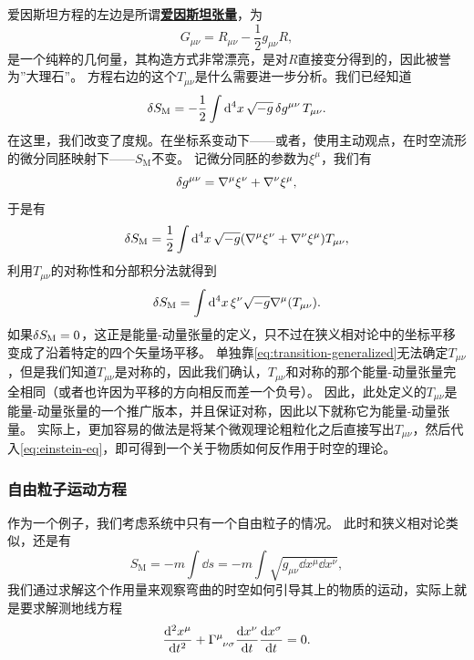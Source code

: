 \documentclass[hyperref, UTF8, a4paper]{ctexart}
\newcommand*{\concept}[1]{\underline{\textbf{#1}}}
\begin{document}
爱因斯坦方程的左边是所谓\concept{爱因斯坦张量}，为
\begin{equation}
    G_{\mu \nu} = R_{\mu \nu} - \frac{1}{2} g_{\mu \nu} R,
\end{equation}
是一个纯粹的几何量，其构造方式非常漂亮，是对$R$直接变分得到的，因此被誉为”大理石”。
方程右边的这个$T_{\mu \nu}$是什么需要进一步分析。我们已经知道
\[
    \var{S_\text{M}} = - \frac{1}{2} \int \dd[4]{x} \sqrt{-g} \var{g^{\mu \nu}} T_{\mu \nu}.
\]
在这里，我们改变了度规。在坐标系变动下——或者，使用主动观点，在时空流形的微分同胚映射下——$S_\text{M}$不变。
记微分同胚的参数为$\xi^\mu$，我们有
\[
    \var{g^{\mu \nu}} = \nabla^\mu \xi^\nu + \nabla^\nu \xi^\mu,
\]
于是有
\[
    \var{S_\text{M}} = \frac{1}{2} \int \dd[4]{x} \sqrt{-g} (\nabla^\mu \xi^\nu + \nabla^\nu \xi^\mu) T_{\mu \nu},
\]
利用$T_{\mu \nu}$的对称性和分部积分法就得到
\begin{equation}
    \var{S_\text{M}} = \int \dd[4]{x} \xi^\nu \sqrt{-g} \nabla^{\mu} (T_{\mu \nu}).
    \label{eq:transition-generalized}
\end{equation}
如果$\var{S_\text{M}}=0$，这正是能量-动量张量的定义，只不过在狭义相对论中的坐标平移变成了沿着特定的四个矢量场平移。
单独靠\eqref{eq:transition-generalized}无法确定$T_{\mu \nu}$，但是我们知道$T_{\mu \nu}$是对称的，因此我们确认，$T_{\mu \nu}$和对称的那个能量-动量张量完全相同（或者也许因为平移的方向相反而差一个负号）。
因此，此处定义的$T_{\mu \nu}$是能量-动量张量的一个推广版本，并且保证对称，因此以下就称它为能量-动量张量。
实际上，更加容易的做法是将某个微观理论粗粒化之后直接写出$T_{\mu \nu}$，然后代入\eqref{eq:einstein-eq}，即可得到一个关于物质如何反作用于时空的理论。

\subsubsection{自由粒子运动方程}

作为一个例子，我们考虑系统中只有一个自由粒子的情况。
此时和狭义相对论类似，还是有
\begin{equation}
    S_\text{M} = - m \int \dd{s} = - m \int \sqrt{g_{\mu \nu} \dd{x^\mu} \dd{x^\nu}},
    \label{eq:free-particle}
\end{equation}
我们通过求解这个作用量来观察弯曲的时空如何引导其上的物质的运动，实际上就是要求解测地线方程
\begin{equation}
    \dv[2]{x^\mu}{t} + \Gamma\indices{^\mu_{\nu \sigma}} \dv{x^\nu}{t} \dv{x^\sigma}{t} = 0.
\end{equation}
\end{document}
